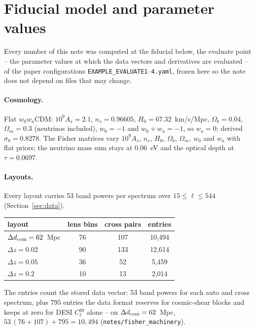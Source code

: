 \documentclass[11pt]{article}
\newcommand{\Nbands}{53}
\begin{document}
\section{Fiducial model and parameter values}
\label{sec:fiducial}

Every number of this note was computed at the fiducial below, the
evaluate point -- the parameter values at which the data vectors and
derivatives are evaluated -- of the paper configurations
\texttt{EXAMPLE\_EVALUATE1}--\texttt{4.yaml}, frozen here so the note
does not depend on files that may change.

\paragraph{Cosmology.}
Flat $w_0 w_a$CDM: $10^9 A_s = 2.1$, $n_s = 0.96605$,
$H_0 = 67.32$~km/s/Mpc, $\Omega_b = 0.04$, $\Omega_m = 0.3$ (neutrinos
included), $w_0 = -1$ and $w_0 + w_a = -1$, so $w_a = 0$; derived
$\sigma_8 = 0.8278$.  The Fisher matrices vary $10^9 A_s$, $n_s$,
$H_0$, $\Omega_b$, $\Omega_m$, $w_0$ and $w_a$ with flat priors; the
neutrino mass sum stays at $0.06$~eV and the optical depth at
$\tau = 0.0697$.

\paragraph{Layouts.}
Every layout carries \Nbands{} band powers per spectrum over
$15 \le \ell \le 544$ (Section~\ref{sec:data}).

\begin{center}
  \begin{tabular}{lccc}
    \toprule
    layout & lens bins & cross pairs & entries \\
    \midrule
    $\Delta d_{\rm com} = 62$~Mpc & 76 & 107 & 10{,}494 \\
    $\Delta z = 0.02$ & 90 & 133 & 12{,}614 \\
    $\Delta z = 0.05$ & 36 & 52 & 5{,}459 \\
    $\Delta z = 0.2$ & 10 & 13 & 2{,}014 \\
    \bottomrule
  \end{tabular}
\end{center}

The entries count the stored data vector: \Nbands{} band powers for
each auto and cross spectrum, plus $795$ entries the data format
reserves for cosmic-shear blocks and keeps at zero for DESI
$C_\ell^{gg}$ alone -- on $\Delta d_{\rm com} = 62$~Mpc,
$53\,(76 + 107) + 795 = 10{,}494$ (\texttt{notes/fisher\_machinery}).
\end{document}
